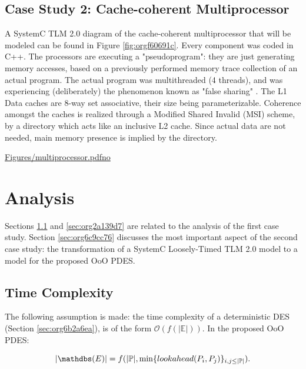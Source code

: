 \documentclass[11pt]{article}
\begin{document}
\clearpage

\subsection{Case Study 2: Cache-coherent Multiprocessor}
\label{sec:orgcf66390}
A SystemC TLM 2.0 diagram of the cache-coherent multiprocessor that will be modeled can be found in Figure \ref{fig:orgf60691c}.
Every component was coded in C++.
The processors are executing a "pseudoprogram": they are just generating memory accesses, based on a previously performed memory trace collection of an actual program.
The actual program was multithreaded (4 threads), and was experiencing (deliberately) the phenomenon known as "false sharing" \cite{Hennessy2011}.
The L1 Data caches are 8-way set associative, their size being parameterizable.
Coherence amongst the caches is realized through a Modified Shared Invalid (MSI) scheme, by a directory which acts like an inclusive L2 cache.
Since actual data are not needed, main memory presence is implied by the directory.

\url{Figures/multiprocessor.pdfno}







\clearpage

\section{Analysis}
\label{sec:org64f0931}
Sections \ref{sec:org8723306} and \ref{sec:org2a139d7} are related to the analysis of the first case study.
Section \ref{sec:org6c9cc76} discusses the most important aspect of the second case study: the transformation of a SystemC Loosely-Timed TLM 2.0 model to a model for the proposed OoO PDES.

\subsection{Time Complexity}
\label{sec:org8723306}
The following assumption is made: the time complexity of a deterministic DES (Section \ref{sec:org6b2a6ea}), is of the form \(\mathcal{O}(f(|\mathds{E}|))\).
In the proposed OoO PDES:

\begin{LATEX}
\begin{equation} 
   |\mathdbs(E)| = f(|\mathbb{P}|, \min\{lookahead(P_i,P_j)\}_{i,j \leq |\mathbb{P}|}).
\end{equation}
\end{LATEX}
\end{document}
